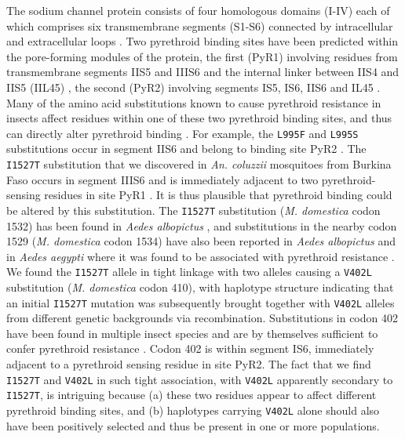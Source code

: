 \documentclass[a4paper,11pt,abstracton,hidelinks]{scrartcl}
\begin{document}
%
The sodium channel protein consists of four homologous domains (I-IV) each of which comprises six transmembrane segments (S1-S6) connected by intracellular and extracellular loops \cite{Dong2014}.
%
Two pyrethroid binding sites have been predicted within the pore-forming modules of the protein, the first (PyR1) involving residues from transmembrane segments IIS5 and IIIS6 and the internal linker between IIS4 and IIS5 (IIL45) \cite{OReilly2006}, the second (PyR2) involving segments IS5, IS6, IIS6 and IL45 \cite{Du2013,Dong2014}.
%
Many of the amino acid substitutions known to cause pyrethroid resistance in insects affect residues within one of these two pyrethroid binding sites, and thus can directly alter pyrethroid binding \cite{Dong2014}.
%
For example, the \texttt{L995F} and \texttt{L995S} substitutions occur in segment IIS6 and belong to binding site PyR2 \cite{Du2013}.
%
The \texttt{I1527T} substitution that we discovered in \textit{An. coluzzii} mosquitoes from Burkina Faso occurs in segment IIIS6 and is immediately adjacent to two pyrethroid-sensing residues in site PyR1 \cite{Dong2014}.
%
It is thus plausible that pyrethroid binding could be altered by this substitution.
%
The \texttt{I1527T} substitution (\textit{M. domestica} codon 1532) has been found in \textit{Aedes albopictus} \cite{Xu2016}, and substitutions in the nearby codon 1529 (\textit{M. domestica} codon 1534) have also been reported in \textit{Aedes albopictus} and in \textit{Aedes aegypti} where it was found to be associated with pyrethroid resistance \cite{Dong2014, Ishak2015,Li2018}.
%
We found the \texttt{I1527T} allele in tight linkage with two alleles causing a \texttt{V402L} substitution (\textit{M. domestica} codon 410), with haplotype structure indicating that an initial \texttt{I1527T} mutation was subsequently brought together with \texttt{V402L} alleles from different genetic backgrounds via recombination.
%
Substitutions in codon 402 have been found in multiple insect species and are by themselves sufficient to confer pyrethroid resistance \cite{Dong2014}.
%
Codon 402 is within segment IS6, immediately adjacent to a pyrethroid sensing residue in site PyR2.
%
The fact that we find \texttt{I1527T} and \texttt{V402L} in such tight association, with \texttt{V402L} apparently secondary to \texttt{I1527T}, is intriguing because (a) these two residues appear to affect different pyrethroid binding sites, and (b) haplotypes carrying \texttt{V402L} alone should also have been positively selected and thus be present in one or more populations.
%
\end{document}
